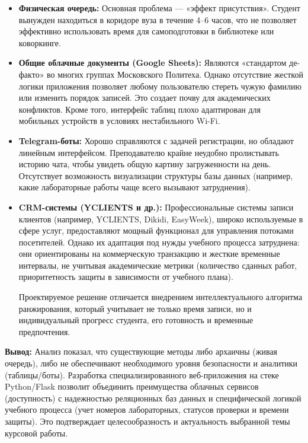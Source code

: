 \begin{itemize}
	\item \textbf{Физическая очередь:} Основная проблема — «эффект присутствия». 
	Студент вынужден находиться в коридоре вуза в течение 4–6 часов, что не позволяет эффективно 
	использовать время для самоподготовки в библиотеке или коворкинге.
	
	\item \textbf{Общие облачные документы (Google Sheets):} Являются «стандартом де-факто» во многих группах
	 Московского Политеха. Однако отсутствие жесткой логики приложения позволяет любому пользователю стереть 
	 чужую фамилию или изменить порядок записей. Это создает почву для академических конфликтов. Кроме того, 
	 интерфейс таблиц плохо адаптирован для мобильных устройств в условиях нестабильного Wi-Fi.
	
	\item \textbf{Telegram-боты:} Хорошо справляются с задачей регистрации, но обладают линейным интерфейсом. 
	Преподавателю крайне неудобно пролистывать историю чата, чтобы увидеть общую картину загруженности на день. 
	Отсутствует возможность визуализации структуры базы данных (например, какие лабораторные работы чаще всего 
	вызывают затруднения).

    \item \textbf{CRM-системы (YCLIENTS и др.):} Профессиональные системы записи клиентов (например, YCLIENTS, 
    Dikidi, EasyWeek), широко используемые в сфере услуг, предоставляют мощный функционал для управления потоками 
    посетителей. Однако их адаптация под нужды учебного процесса затруднена: они ориентированы на коммерческую 
    транзакцию и жесткие временные интервалы, не учитывая академические метрики (количество сданных работ, 
    приоритетность защиты в зависимости от учебного плана).

Проектируемое решение отличается внедрением интеллектуального алгоритма ранжирования, который учитывает не 
только время записи, но и индивидуальный прогресс студента, его готовность и временные предпочтения.

\end{itemize}

\textbf{Вывод:} Анализ показал, что существующие методы либо архаичны (живая очередь), либо не 
обеспечивают необходимого уровня безопасности и аналитики (таблицы/боты). Разработка специализированного 
веб-приложения на стеке Python/Flask позволит объединить преимущества облачных сервисов (доступность) с надежностью 
реляционных баз данных и специфической логикой учебного процесса (учет номеров лабораторных, статусов проверки и 
времени защиты). Это подтверждает целесообразность и актуальность выбранной темы курсовой работы.

